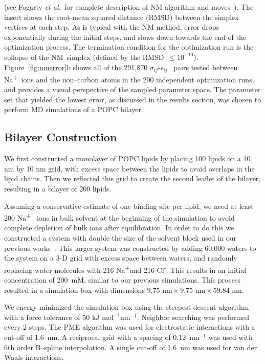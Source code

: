 \documentclass[12pt,openany,final]{book}
\newcommand{\etal}{\textit{et al.}}
\newcommand{\sigmaij}{$\sigma_{ij}$}
\newcommand{\epsilonij}{$\epsilon_{ij}$}
\newcommand{\na}{Na\textsuperscript{+}}
\newcommand{\cl}{Cl\textsuperscript{-}}
\begin{document}
(see Fogarty \etal~for complete description of NM algorithm and
moves~\cite{fogarty:2014:paropt}).
The insert shows the root-mean squared distance (RMSD) between the simplex vertices at each step. 
As is typical with the NM method, error drops exponentially during the
initial steps, and slows down towards the end of the optimization
process. The termination condition for the optimization run is the
collapse of the NM--simplex (defined by the RMSD~$\leq 10^{-10}$).
Figure~\ref{fig:nmerror}b shows all of the 291,870 \sigmaij-\epsilonij~ pairs tested 
between \na~ions and the non--carbon atoms in the 200 independent optimization runs,
and provides a visual perspective of the sampled parameter space.
The parameter set that yielded the lowest error, as discussed in the results section, was
chosen to perform MD simulations of a POPC bilayer.

\subsection{Bilayer Construction}

We first constructed a monolayer of POPC lipids by placing 100 lipids on
a 10 nm by 10 nm grid, with excess space between the lipids to avoid overlaps in the lipid chains. 
Then we reflected this grid to create the second 
leaflet of the bilayer, resulting in a bilayer of 200 lipids. 

Assuming a conservative estimate of one binding site per lipid, we
need at least 200 \na~ ions in bulk solvent at the beginning of the simulation
to avoid complete depletion of bulk ions after equilibration. 
In order to do this we constructed a system with
double the size of the solvent block used in our previous
works~\cite{kruczek:2017,kruczek:2019}.  This larger system was
constructed by adding 60,000 waters to the system on a 3-D grid with
    excess space between waters, and randomly
replacing water molecules with 216 \na and 216 \cl. 
This results in an initial concentration of 200~mM, similar to our previous simulations.
This process resulted in a simulation box with dimensions $9.75  \text{~nm}\times9.75  \text{~nm}\times59.84 \text{~nm}$.

We energy-minimized the simulation box using the steepest descent
algorithm with a force tolerance of 50 $\text{kJ mol}^{-1}\text{nm}^{-1}$. 
Neighbor searching was performed every 2 steps. 
The PME algorithm was used for electrostatic interactions with a cut-off of 1.6~nm. 
A reciprocal grid with a spacing of 0.12~nm$^{-1}$ was used with 6th order B--spline interpolation. 
A single cut-off of 1.6~nm was used for van der Waals interactions.
\end{document}
